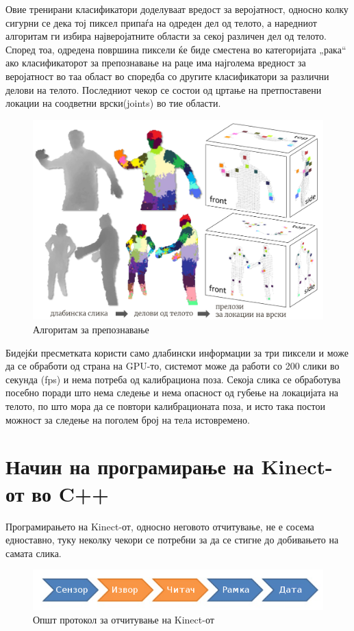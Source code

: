 \documentclass[12pt]{article}
\begin{document}
  Овие тренирани класификатори доделуваат вредост за веројатност, односно колку сигурни се дека тој пиксел припаѓа на одреден дел од телото, а наредниот алгоритам ги избира најверојатните области за секој различен дел од телото. Според тоа, одредена површина пиксели ќе биде сместена во категоријата „рака“ ако класификаторот за препознавање на раце има најголема вредност за веројатност во таа област во споредба со другите класификатори за различни делови на телото. Последниот чекор се состои од цртање на претпоставени локации на соодветни врски(joints) во тие области.

  \begin{figure}[H]
    \includegraphics[width=0.75\linewidth]{./images/bodyparts.png}
    \centering
    \caption{Алгоритам за препознавање}
    \label{fig:bodyparts.png}
    \end{figure}

  Бидејќи пресметката користи само длабински информации за три пиксели и може да се обработи од страна на GPU-то, системот може да работи со 200 слики во секунда (fps) и нема потреба од калибрациона поза. Секоја слика се обработува посебно поради што нема следење и нема опасност од губење на локацијата на телото, по што мора да се повтори калибрационата поза, и исто така постои можност за следење на поголем број на тела истовремено.

\newpage

\section{Начин на програмирање на Kinect-от во C++}
  Програмирањето на Kinect-от, односно неговото отчитување, не е сосема едноставно, туку неколку чекори се потребни за да се стигне до добивањето на самата слика.

  \begin{figure}[H]
    \includegraphics[width=0.75\linewidth]{./images/programming_flow_trimmed.png}
    \centering
    \caption{Општ протокол за отчитување на Kinect-от}
    \label{fig:programming_flow_trimmed.png}
    \end{figure}
\end{document}
